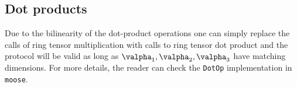 \subsection{Dot products}

Due to the bilinearity of the dot-product operations
one can simply replace the calls of ring tensor multiplication with
calls to ring tensor dot product and the protocol will be valid as long as
$\valpha_1, \valpha_2, \valpha_3$ have matching dimensions.
For more details, the reader can check the
\verb|DotOp| implementation in \verb|moose|.




